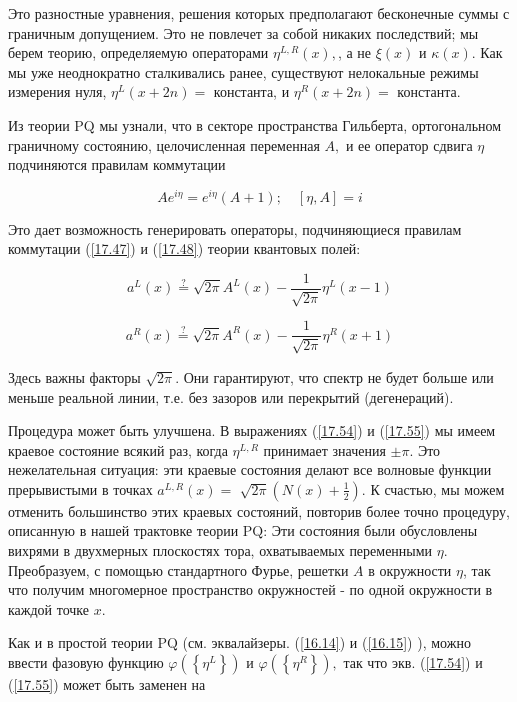 \documentclass[main.tex]{subfiles}
\begin{document}
Это разностные уравнения, решения которых предполагают бесконечные суммы с граничным допущением. Это не повлечет за собой никаких последствий; мы берем теорию, определяемую операторами $\eta^{L, R}(x),$, а не $\xi(x)$ и $\kappa(x)$. Как мы уже неоднократно сталкивались ранее, существуют нелокальные режимы измерения нуля, $\eta^{L}(x+2 n)=$ константа, и $\eta^{R}(x+2 n)=$ константа.

Из теории $\mathrm{PQ}$ мы узнали, что в секторе пространства Гильберта, ортогональном граничному состоянию, целочисленная переменная $A,$ и ее оператор сдвига $\eta$ подчиняются правилам коммутации

\begin{equation}\label{17.53}
A e^{i \eta}=e^{i \eta}(A+1) ; \quad[\eta, A]=i
\end{equation}

Это дает возможность генерировать операторы, подчиняющиеся правилам коммутации (\ref{17.47}) и (\ref{17.48}) теории квантовых полей:

\begin{equation}\label{17.54}
a^{L}(x) \stackrel{?}{=} \sqrt{2 \pi} A^{L}(x)-\frac{1}{\sqrt{2 \pi}} \eta^{L}(x-1)
\end{equation}

\begin{equation}\label{17.55}
a^{R}(x) \stackrel{?}{=} \sqrt{2 \pi} A^{R}(x)-\frac{1}{\sqrt{2 \pi}} \eta^{R}(x+1)
\end{equation}

Здесь важны факторы $\sqrt{2 \pi}$. Они гарантируют, что спектр не будет больше или меньше реальной линии, т.е. без зазоров или перекрытий (дегенераций).

Процедура может быть улучшена. В выражениях (\ref{17.54}) и (\ref{17.55}) мы имеем краевое состояние всякий раз, когда $\eta^{L, R}$ принимает значения $\pm \pi .$ Это нежелательная ситуация: эти краевые состояния делают все волновые функции прерывистыми в точках $a^{L, R}(x)=$ $\sqrt{2 \pi}\left(N(x)+\frac{1}{2}\right) .$ К счастью, мы можем отменить большинство этих краевых состояний, повторив более точно процедуру, описанную в нашей трактовке теории $\mathrm{PQ}$: Эти состояния были обусловлены вихрями в двухмерных плоскостях тора, охватываемых переменными $\eta$. Преобразуем, с помощью стандартного Фурье, решетки $A$ в окружности $\eta$, так что получим многомерное пространство окружностей - по одной окружности в каждой точке $x$.

Как и в простой теории $\mathrm{PQ}$ (см. эквалайзеры. (\ref{16.14}) и (\ref{16.15}) ), можно ввести фазовую функцию $\varphi\left(\left\{\eta^{L}\right\}\right)$ и $\varphi\left(\left\{\eta^{R}\right\}\right),$ так что экв. (\ref{17.54}) и (\ref{17.55}) может быть заменен на
\end{document}
